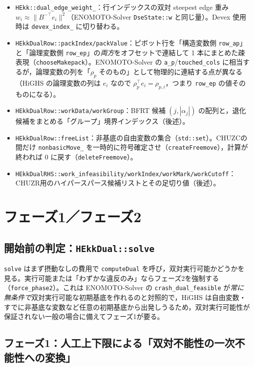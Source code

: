 \documentclass[11pt,a4paper]{ltjsarticle}
\newcommand{\code}[1]{\texttt{#1}}
\begin{document}
\begin{itemize}
  \item \code{HEkk::dual\_edge\_weight\_}：行インデックスの双対 steepest edge 重み $w_i \approx \lVert B^{-\top}e_i\rVert^2$（ENOMOTO-Solver \code{DseState::w} と同じ量）。Devex 使用時は \code{devex\_index\_} に切り替わる。
  \item \code{HEkkDualRow::packIndex/packValue}：ピボット行を「構造変数側 \code{row\_ap}」と「論理変数側 \code{row\_ep}」の\emph{両方}をオフセットで連結して 1 本にまとめた疎表現（\code{chooseMakepack}）。ENOMOTO-Solver の \code{a\_p}/\code{touched\_cols} に相当するが，論理変数の列を「$\rho_p$ そのもの」として物理的に連結する点が異なる（HiGHS の論理変数の列は $e_i$ なので $\rho_p^\top e_i=\rho_{p,i}$，つまり \code{row\_ep} の値そのものになる）。
  \item \code{HEkkDualRow::workData/workGroup}：BFRT 候補 $(j, |\alpha_j|)$ の配列と，退化候補をまとめる「グループ」境界インデックス（後述）。
  \item \code{HEkkDualRow::freeList}：非基底の自由変数の集合（\code{std::set}）。CHUZCの間だけ \code{nonbasicMove\_} を一時的に符号確定させ（\code{createFreemove}），計算が終われば $0$ に戻す（\code{deleteFreemove}）。
  \item \code{HEkkDualRHS::work\_infeasibility/workIndex/workMark/workCutoff}：CHUZR用のハイパースパース候補リストとその足切り値（後述）。
\end{itemize}

\section{フェーズ1／フェーズ2}

\subsection{開始前の判定：\code{HEkkDual::solve}}

\code{solve} はまず摂動なしの費用で \code{computeDual} を呼び，双対実行可能かどうかを見る。実行可能または「わずかな違反のみ」ならフェーズ2を強制する（\code{force\_phase2}）。これは ENOMOTO-Solver の \code{crash\_dual\_feasible} が\emph{常に無条件で}双対実行可能な初期基底を作れるのと対照的で，HiGHS は自由変数・すでに非基底な変数など任意の初期基底から出発しうるため，双対実行可能性が保証されない一般の場合に備えてフェーズ1が要る。

\subsection{フェーズ1：人工上下限による「双対不能性の一次不能性への変換」}
\end{document}
